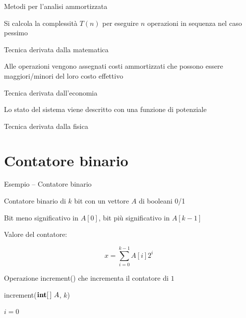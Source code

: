 \begin{frame}{Metodi per l'analisi ammortizzata}

\vspace{-9pt}
\small
\begin{myboxtitle}
\BI
\item Si calcola la complessità $T(n)$ per eseguire $n$ operazioni in sequenza nel \alert{caso pessimo}
\item Tecnica derivata dalla matematica
\EI
\end{myboxtitle}
\begin{myboxtitle}
\BI
\item Alle operazioni vengono assegnati \alert{costi ammortizzati} che possono essere maggiori/minori del loro costo effettivo
\item Tecnica derivata dall'economia
\EI
\end{myboxtitle}
\begin{myboxtitle}
\BI
\item Lo stato del sistema viene descritto con una \alert{funzione di potenziale}
\item Tecnica derivata dalla fisica	
\EI
\end{myboxtitle}

\end{frame}


\section{Contatore binario}	

\begin{frame}[shrink=10]{Esempio -- Contatore binario}

\vspace{-9pt}
\begin{myboxtitle}
\BI
\item Contatore binario di $k$ bit con un vettore $A$ di booleani 0/1
\item Bit meno significativo in $A[0]$, bit più significativo in $A[k-1]$
\item Valore del contatore: \parbox[c]{6cm}{{ \[x = \sum_{i=0}^{k-1} A[i] 2^i\]}}
\vspace{-4pt}
\item Operazione \textsf{increment}() che incrementa il contatore di $1$
\EI
\end{myboxtitle}

\smallskip
\begin{Procedure}
\caption[A]{\textsf{increment}($\INTARRAY\ A$, \INTEGER $k$)}
\INTEGER $i = 0$\;
\end{Procedure}

\end{frame}


